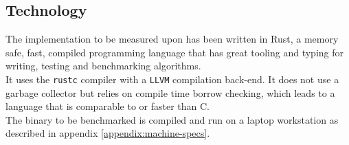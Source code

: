 \subsection{Technology}
The implementation to be measured upon has been written in Rust, a memory safe, fast, compiled programming language\cite{rust-lang} that has great tooling and typing for writing, testing and benchmarking algorithms.\\
It uses the \texttt{rustc} compiler with a \texttt{LLVM} compilation back-end. It does not use a garbage collector but relies on compile time borrow checking, which leads to a language that is comparable to or faster than C\cite{highleveldrivers}.\\
The binary to be benchmarked is compiled and run on a laptop workstation as described in appendix \ref{appendix:machine-specs}.
